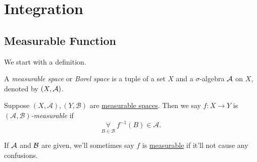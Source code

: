 \section{Integration}\label{sec:Integration}
\subsection{Measurable Function}
We start with a definition.

\begin{definition}\label{def:measurable-space}
	A \emph{measurable space} or \emph{Borel space} is a tuple of a set \(X\) and a \(\sigma\)-algebra \(\mathcal{\MakeUppercase{a}} \) on \(X\),
	denoted by \((X, \mathcal{\MakeUppercase{a}} )\).
\end{definition}

\begin{definition}\label{def:measurable-function}
	Suppose \((X, \mathcal{A} ), (Y, \mathcal{B} )\) are \hyperref[def:measurable-space]{measurable spaces}. Then we say \(f\colon X\to Y\) is
	\emph{\((\mathcal{A} , \mathcal{B} )\)-measurable} if
	\[
		\underset{B\in \mathcal{B}}{\forall}\ f^{-1} (B)\in \mathcal{A}.
	\]
\end{definition}

\begin{remark}
	If \(\mathcal{\MakeUppercase{a}} \) and \(\mathcal{\MakeUppercase{b}} \) are given, we'll sometimes say \(f\) is \hyperref[def:measurable-function]{measurable}
	if it'll not cause any confusions.
\end{remark}

